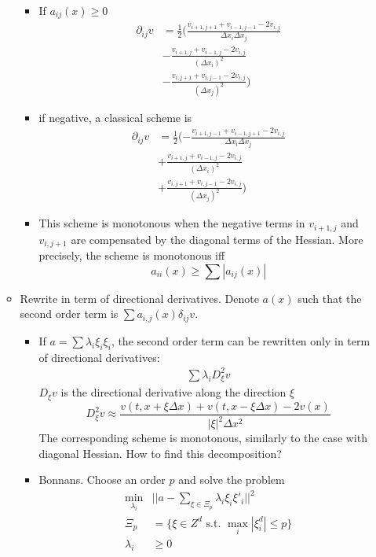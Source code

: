 \documentclass[english]{article}
\begin{document}
\begin{itemize}
\begin{itemize}
\begin{itemize}
			\item If $a_{ij}(x) \geq 0$
			\begin{align*}
				\partial_{ij}v&= \frac{1}{2}(\frac{v_{i+1, j+1} + v_{i-1, j-1}- 2v_{i,j}}{\Delta x_i \Delta x_j} \\
				&-  \frac{v_{i+1, j} + v_{i-1, j}- 2v_{i,j}}{(\Delta x_i)^2}\\
				&-  \frac{v_{i, j+1} + v_{i, j-1}- 2v_{i,j}}{(\Delta x_j)^2})
			\end{align*}
			\item if negative, a classical scheme is
			\begin{align*}
				\partial_{ij}v&= \frac{1}{2}(-\frac{v_{i+1, j-1} + v_{i-1, j+1}- 2v_{i,j}}{\Delta x_i \Delta x_j} \\
				&+  \frac{v_{i+1, j} + v_{i-1, j}- 2v_{i,j}}{(\Delta x_i)^2}\\
				&+  \frac{v_{i, j+1} + v_{i, j-1}- 2v_{i,j}}{(\Delta x_j)^2})
			\end{align*}
			\item This scheme is monotonous when the negative terms in $v_{i+1, j}$ and $v_{i, j+1}$ are compensated by the diagonal terms of the Hessian. More precisely, the scheme is monotonous iff 		$$a_{ii}(x) \geq \sum |a_{ij}(x)|$$
		\end{itemize}
		\item Rewrite in term of directional derivatives. Denote $a(x)$ such that the second order term is $\sum a_{i, j}(x) \delta_{ij} v$.
		\begin{itemize}
			\item If  $a = \sum \lambda_i \xi_i \xi_i$, the second order term can be rewritten only in term of directional derivatives:
			\begin{align*}
				\sum \lambda_i D_\xi^2v
			\end{align*}
			$D_\xi v$ is the directional derivative along the direction $\xi$
			$$D^2_\xi v \approx \frac{v(t, x+\xi \Delta x) + v(t, x-\xi \Delta x) - 2 v(x)}{|\xi|^2 \Delta x^2}$$
			The corresponding scheme is monotonous, similarly to the case with diagonal Hessian. 
			How to find this decomposition?
			\item 
			Bonnans. Choose an order $p$ and solve the problem 
			\begin{align*}
				\min_{\lambda_i}&||a - \sum_{\xi \in \Xi_p} \lambda_i \xi_i \xi'_i||^2\\
				\Xi_p &= \{\xi \in Z^d \text{ s.t. }  \max_i|\xi_i^d| \leq p \}\\
				\lambda_i &\geq 0
			\end{align*}

\end{itemize}
\end{itemize}
\end{itemize}
\end{document}
